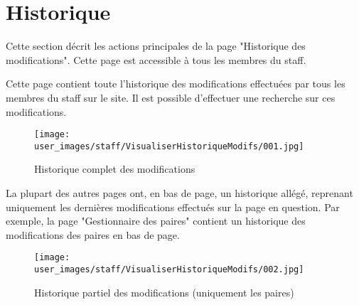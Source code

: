 \section{Historique}

Cette section décrit les actions principales de la page "Historique des modifications". Cette page est accessible à tous les membres du staff.\newline

Cette page contient toute l'historique des modifications effectuées par tous les membres du staff sur le site. Il est possible d'effectuer une recherche sur ces modifications.

\begin{figure}[H]
\centering
\texttt{[image: user\_images/staff/VisualiserHistoriqueModifs/001.jpg]}
\caption{Historique complet des modifications}
\end{figure}

La plupart des autres pages ont, en bas de page, un historique allégé, reprenant uniquement les dernières modifications effectués sur la page en question. Par exemple, la page "Gestionnaire des paires" contient un historique des modifications des paires en bas de page.

\begin{figure}[H]
\centering
\texttt{[image: user\_images/staff/VisualiserHistoriqueModifs/002.jpg]}
\caption{Historique partiel des modifications (uniquement les paires)}
\end{figure}